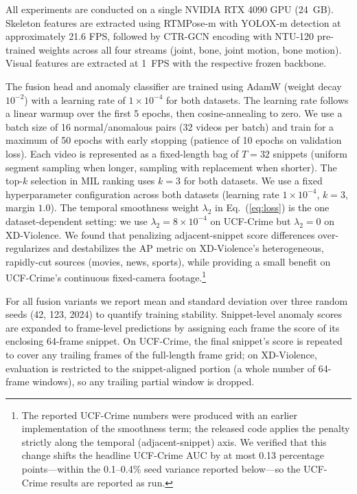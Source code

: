 \documentclass[sigconf]{acmart}
\begin{document}
All experiments are conducted on a single NVIDIA RTX 4090 GPU (24~GB). Skeleton features are extracted using RTMPose-m with YOLOX-m detection at approximately 21.6 FPS, followed by CTR-GCN encoding with NTU-120 pre-trained weights across all four streams (joint, bone, joint motion, bone motion). Visual features are extracted at 1~FPS with the respective frozen backbone.

The fusion head and anomaly classifier are trained using AdamW (weight decay $10^{-2}$) with a learning rate of $1 \times 10^{-4}$ for both datasets. The learning rate follows a linear warmup over the first 5 epochs, then cosine-annealing to zero. We use a batch size of 16 normal/anomalous pairs (32 videos per batch) and train for a maximum of 50 epochs with early stopping (patience of 10 epochs on validation loss). Each video is represented as a fixed-length bag of $T=32$ snippets (uniform segment sampling when longer, sampling with replacement when shorter). The top-$k$ selection in MIL ranking uses $k=3$ for both datasets. We use a fixed hyperparameter configuration across both datasets (learning rate $1 \times 10^{-4}$, $k=3$, margin $1.0$). The temporal smoothness weight $\lambda_2$ in Eq.~(\ref{eq:loss}) is the one dataset-dependent setting: we use $\lambda_2 = 8 \times 10^{-4}$ on UCF-Crime but $\lambda_2 = 0$ on XD-Violence. We found that penalizing adjacent-snippet score differences over-regularizes and destabilizes the AP metric on XD-Violence's heterogeneous, rapidly-cut sources (movies, news, sports), while providing a small benefit on UCF-Crime's continuous fixed-camera footage.\footnote{The reported UCF-Crime numbers were produced with an earlier implementation of the smoothness term; the released code applies the penalty strictly along the temporal (adjacent-snippet) axis. We verified that this change shifts the headline UCF-Crime AUC by at most 0.13 percentage points---within the 0.1--0.4\% seed variance reported below---so the UCF-Crime results are reported as run.}

For all fusion variants we report mean and standard deviation over three random seeds (42, 123, 2024) to quantify training stability. Snippet-level anomaly scores are expanded to frame-level predictions by assigning each frame the score of its enclosing 64-frame snippet. On UCF-Crime, the final snippet's score is repeated to cover any trailing frames of the full-length frame grid; on XD-Violence, evaluation is restricted to the snippet-aligned portion (a whole number of 64-frame windows), so any trailing partial window is dropped.
\end{document}
